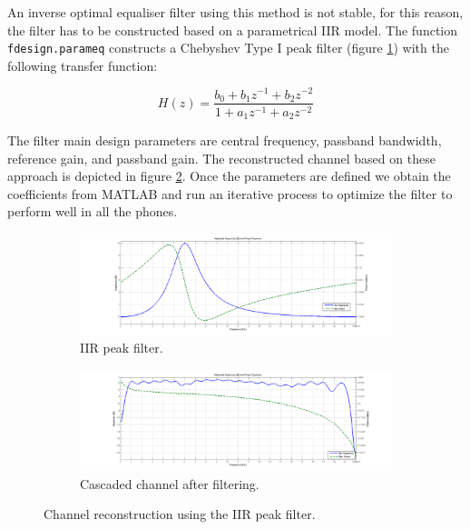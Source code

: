 \documentclass[12pt,a4paper,openright]{report}
\begin{document}
An inverse optimal equaliser filter using this method is not stable, for this reason, the filter has to be constructed based on a parametrical IIR model. The function \texttt{fdesign.parameq} constructs a Chebyshev Type I peak filter (figure   \ref{fig:IIRpeak}) with the following transfer function:

\begin{equation}
H\left( z \right) = \frac{{{b_0} + {b_1}{z^{ - 1}} + {b_2}{z^{ - 2}}}}{{1 + {a_1}{z^{ - 1}} + {a_2}{z^{ - 2}}}}
\end{equation}

The filter main design parameters are central frequency, passband bandwidth, reference gain, and passband gain. The reconstructed channel based on these approach is depicted in figure \ref{fig:cascadefilter}. Once the parameters are defined we obtain the coefficients from MATLAB and run an iterative process to optimize the filter to perform well in all the phones.

\begin{figure}[H]
\centering
\begin{subfigure}[H]{.8\textwidth}
  \centering
  \includegraphics[width=1\linewidth]{peakFilter.png}
  \caption{IIR peak filter.}
  \label{fig:IIRpeak}
  \quad
\end{subfigure}%
\quad
\begin{subfigure}[H]{.8\textwidth}
  \centering
  \includegraphics[width=1\linewidth]{reconstChan.png}
  \caption{Cascaded channel after filtering.}
  \label{fig:cascadefilter}
\end{subfigure}
\caption[Channel reconstruction using the IIR peak filter]{Channel reconstruction using the IIR peak filter.}
   \label{fig:chanReconstruction}
    \end{figure}
\end{document}
